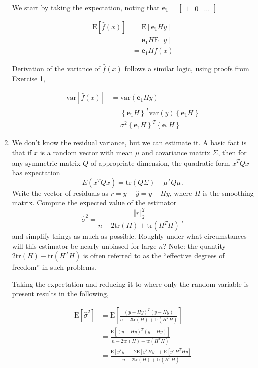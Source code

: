 \documentclass[10pt]{article}
\begin{document}
\begin{enumerate}[label=(\Alph*)]
        We start by taking the expectation, noting that $\mathbf{e}_1 = \begin{bmatrix} 1 & 0 & \dots \end{bmatrix}$
        
        \begin{align*}
            \text{E} \left[ \hat{f}(x) \right] &= \text{E} \left[ \mathbf{e}_1 H y\right] \\
            &= \mathbf{e}_1 H \text{E}[y] \\
            &= \mathbf{e}_1 H f(x)
        \end{align*}

        Derivation of the variance of $\hat{f}(x)$ follows a similar logic, using proofs from Exercise 1,

        \begin{align*}
            \text{var}[\hat{f}(x)] &= \text{var}(\mathbf{e}_1 H y) \\
            & = \left \{ \mathbf{e}_1 H \right \}^T \text{var}(y) \left \{ \mathbf{e}_1 H \right \} \\
            & = \sigma^2 \left \{ \mathbf{e}_1 H \right \}^T \left \{ \mathbf{e}_1 H \right \}
        \end{align*}


        \item We don't know the residual variance, but we can estimate it.  A basic fact is that if $x$ is a random vector with mean $\mu$ and covariance matrix $\Sigma$, then for any symmetric matrix $Q$ of appropriate dimension, the quadratic form $x^T Q x$ has expectation
        $$
        E(x^T Q x) = \mbox{tr}(Q \Sigma) + \mu^T Q \mu \, .
        $$
        Write the vector of residuals as $r = y - \hat{y} = y - Hy$, where $H$ is the smoothing matrix.  Compute the expected value of the estimator
        $$
        \hat{\sigma}^2 = \frac{\Vert r \Vert_2^2}{n - 2\mbox{tr}(H) + \mbox{tr}(H^T H)} \, ,
        $$
        and simplify things as much as possible.  Roughly under what circumstances will this estimator be nearly unbiased for large $n$?  Note: the quantity $2\mbox{tr}(H) - \mbox{tr}(H^T H)$ is often referred to as the ``effective degrees of freedom'' in such problems.

        Taking the expectation and reducing it to where only the random variable is present results in the following,

        \begin{align*}
            \text{E} \left[ \hat{\sigma}^2\right] &= \text{E} \left[ \frac{(y - Hy)^T (y - Hy)}{n - 2\mbox{tr}(H) + \mbox{tr}(H^T H)} \right] \\
            &= \frac{\text{E}[(y - Hy)^T (y - Hy)]}{n - 2\mbox{tr}(H) + \mbox{tr}(H^T H)} \\
            &= \frac{\text{E}[y^Ty] - 2 \text{E}[y^T H y] + \text{E}[y^T H^T H y]}{n - 2\mbox{tr}(H) + \mbox{tr}(H^T H)}
        \end{align*}


\end{enumerate}
\end{document}
